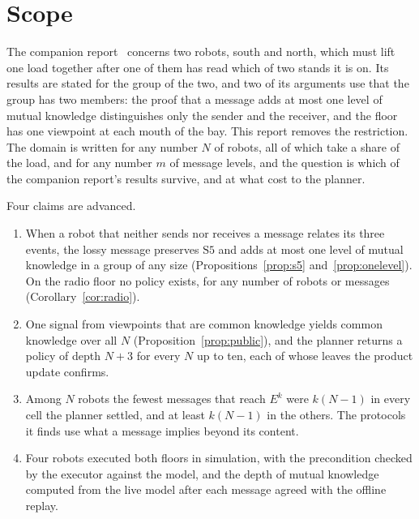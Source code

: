 \documentclass[11pt,a4paper]{article}
\theoremstyle{definition}
\begin{document}
\tableofcontents
\newpage

\section{Scope}
\label{sec:scope}

The companion report~\cite{ulises2026ca} concerns two robots, south and north,
which must lift one load together after one of them has read which of two
stands it is on. Its results are stated for the group of the two, and two of
its arguments use that the group has two members: the proof that a message adds
at most one level of mutual knowledge distinguishes only the sender and the
receiver, and the floor has one viewpoint at each mouth of the bay. This report
removes the restriction. The domain is written for any number $N$ of robots,
all of which take a share of the load, and for any number $m$ of message
levels, and the question is which of the companion report's results survive,
and at what cost to the planner.

Four claims are advanced.

\begin{enumerate}[leftmargin=1.4em, itemsep=2pt]
  \item When a robot that neither sends nor receives a message relates its
        three events, the lossy message preserves $\mathrm{S5}$ and adds at
        most one level of mutual knowledge in a group of any size
        (Propositions~\ref{prop:s5} and~\ref{prop:onelevel}). On the radio
        floor no policy exists, for any number of robots or messages
        (Corollary~\ref{cor:radio}).
  \item One signal from viewpoints that are common knowledge yields common
        knowledge over all $N$ (Proposition~\ref{prop:public}), and the
        planner returns a policy of depth $N + 3$ for every $N$ up to ten, each
        of whose leaves the product update confirms.
  \item Among $N$ robots the fewest messages that reach $E^k$ were $k(N-1)$ in
        every cell the planner settled, and at least $k(N-1)$ in the others.
        The protocols it finds use what a message implies beyond its content.
  \item Four robots executed both floors in simulation, with the precondition
        checked by the executor against the model, and the depth of mutual
        knowledge computed from the live model after each message agreed with
        the offline replay.
\end{enumerate}
\end{document}
